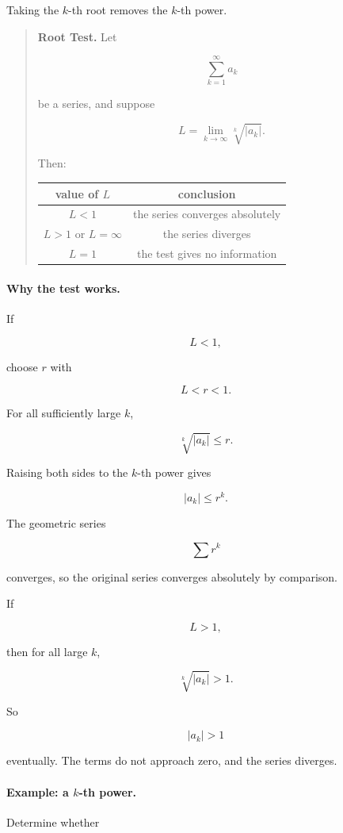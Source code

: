 Taking the \(k\)-th root removes the \(k\)-th power.

\begin{quote}
\textbf{Root Test.}
Let

\[
\sum_{k=1}^{\infty}a_k
\]

be a series, and suppose

\[
L=\lim_{k\to\infty}\sqrt[k]{|a_k|}.
\]

Then:

\begin{center}
\begin{tabular}{c|c}
\textbf{value of \(L\)} & \textbf{conclusion} \\ \hline
\(L<1\) & the series converges absolutely \\[3pt]
\(L>1\) or \(L=\infty\) & the series diverges \\[3pt]
\(L=1\) & the test gives no information
\end{tabular}
\end{center}
\end{quote}

\paragraph{Why the test works.}
If

\[
L<1,
\]

choose \(r\) with

\[
L<r<1.
\]

For all sufficiently large \(k\),

\[
\sqrt[k]{|a_k|}\le r.
\]

Raising both sides to the \(k\)-th power gives

\[
|a_k|\le r^k.
\]

The geometric series

\[
\sum r^k
\]

converges, so the original series converges absolutely by comparison.

If

\[
L>1,
\]

then for all large \(k\),

\[
\sqrt[k]{|a_k|}>1.
\]

So

\[
|a_k|>1
\]

eventually.  The terms do not approach zero, and the series diverges.

\paragraph{Example: a \(k\)-th power.}
Determine whether

